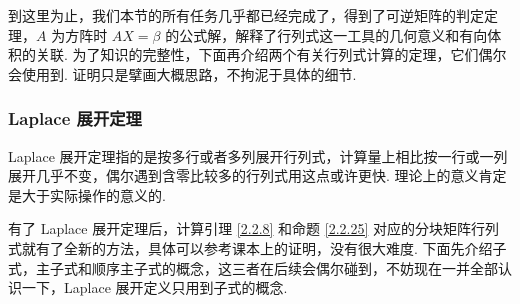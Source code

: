 \documentclass[10pt,openany]{article}
\theoremstyle{thmstyle} %
\theoremstyle{defstyle} %
\theoremstyle{prostyle} %
\theoremstyle{exastyle}
\theoremstyle{remstyle}
\begin{document}
到这里为止，我们本节的所有任务几乎都已经完成了，得到了可逆矩阵的判定定理，\( A \) 为方阵时 \( AX=\beta \) 的公式解，解释了行列式这一工具的几何意义和有向体积的关联. 为了知识的完整性，下面再介绍两个有关行列式计算的定理，它们偶尔会使用到. 证明只是擘画大概思路，不拘泥于具体的细节.

\subsubsection{Laplace 展开定理}

Laplace 展开定理指的是按多行或者多列展开行列式，计算量上相比按一行或一列展开几乎不变，偶尔遇到含零比较多的行列式用这点或许更快. 理论上的意义肯定是大于实际操作的意义的.

有了 Laplace 展开定理后，计算引理 \ref{2.2.8} 和命题 \ref{2.2.25} 对应的分块矩阵行列式就有了全新的方法，具体可以参考课本上的证明，没有很大难度. 下面先介绍子式，主子式和顺序主子式的概念，这三者在后续会偶尔碰到，不妨现在一并全部认识一下，Laplace 展开定义只用到子式的概念. 
\end{document}
